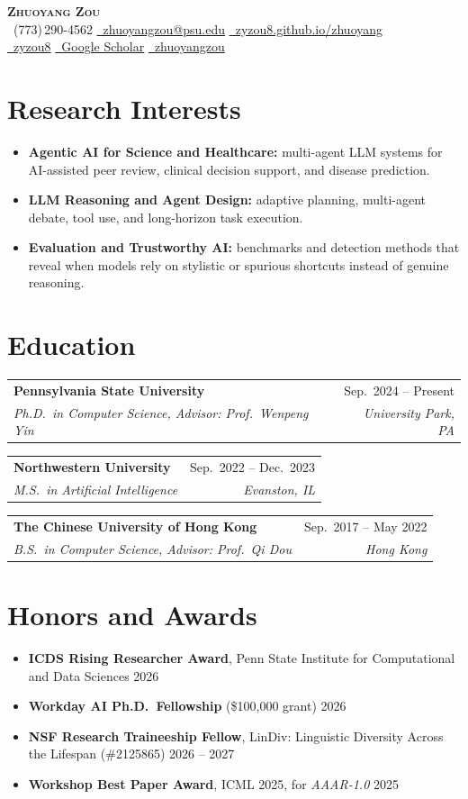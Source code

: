 \documentclass[letterpaper,10pt]{article}
\makeatletter
\newcommand{\entry}[4]{%
  \begin{tabular*}{\textwidth}{@{}l@{\extracolsep{\fill}}r@{}}
    \textbf{#1} & \small #2 \\
    \small\textit{#3} & \small\textit{#4}
  \end{tabular*}\par\vspace{1pt}}
\newcommand{\dated}[2]{\item #1 \hfill #2}
\newenvironment{cvlist}
  {\begin{itemize}[leftmargin=0.16in, label=\textbullet, itemsep=2pt, parsep=0pt, topsep=2pt]\small}
  {\end{itemize}\vspace{3pt}}
\makeatother
\begin{document}
\begin{center}
  {\LARGE\bfseries\scshape Zhuoyang Zou}\\[6pt]
  \small
  \faPhone\ (773)\,290-4562 \quad\textbar\quad
  \href{mailto:zhuoyangzou@psu.edu}{\faEnvelope\ zhuoyangzou@psu.edu} \quad\textbar\quad
  \href{https://zyzou8.github.io/zhuoyang/}{\faGlobe\ zyzou8.github.io/zhuoyang}\\[2pt]
  \href{https://github.com/zyzou8}{\faGithub\ zyzou8} \quad\textbar\quad
  \href{https://scholar.google.com/citations?user=n8gewTkAAAAJ}{\faGraduationCap\ Google Scholar} \quad\textbar\quad
  \href{https://www.linkedin.com/in/zhuoyangzou/}{\faLinkedin\ zhuoyangzou}
\end{center}
\vspace{-6pt}

\section{Research Interests}
\begin{cvlist}
  \item \textbf{Agentic AI for Science and Healthcare:} multi-agent LLM systems for AI-assisted peer review, clinical decision support, and disease prediction.
  \item \textbf{LLM Reasoning and Agent Design:} adaptive planning, multi-agent debate, tool use, and long-horizon task execution.
  \item \textbf{Evaluation and Trustworthy AI:} benchmarks and detection methods that reveal when models rely on stylistic or spurious shortcuts instead of genuine reasoning.
\end{cvlist}

\section{Education}
\entry{Pennsylvania State University}{Sep.\ 2024 -- Present}{Ph.D.\ in Computer Science, Advisor: Prof.\ Wenpeng Yin}{University Park, PA}
\vspace{3pt}
\entry{Northwestern University}{Sep.\ 2022 -- Dec.\ 2023}{M.S.\ in Artificial Intelligence}{Evanston, IL}
\vspace{3pt}
\entry{The Chinese University of Hong Kong}{Sep.\ 2017 -- May 2022}{B.S.\ in Computer Science, Advisor: Prof.\ Qi Dou}{Hong Kong}

\section{Honors and Awards}
\begin{cvlist}
  \dated{\textbf{ICDS Rising Researcher Award}, Penn State Institute for Computational and Data Sciences}{2026}
  \dated{\textbf{Workday AI Ph.D.\ Fellowship} (\$100,000 grant)}{2026}
  \dated{\textbf{NSF Research Traineeship Fellow}, LinDiv: Linguistic Diversity Across the Lifespan (\#2125865)}{2026 -- 2027}
  \dated{\textbf{Workshop Best Paper Award}, ICML 2025, for \textit{AAAR-1.0}}{2025}
\end{cvlist}
\end{document}

